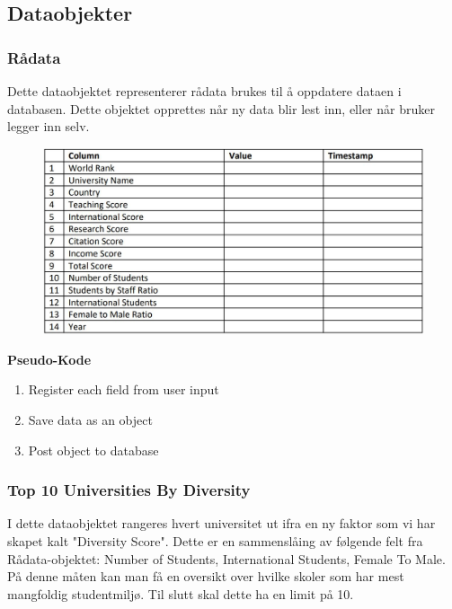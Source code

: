 \subsection{Dataobjekter}
\subsubsection{Rådata}
Dette dataobjektet representerer rådata brukes til å oppdatere dataen i databasen. Dette objektet 
opprettes når ny data blir lest inn, eller når bruker legger inn selv.

\FigureCounter
\begin{figure}[H]
  \includegraphics[scale=1]{images/milepael4/rawObject.JPG}
\end{figure}

\textbf{Pseudo-Kode}
\begin{enumerate}
  \item Register each field from user input
  \item Save data as an object
  \item Post object to database
\end{enumerate}

\subsubsection{Top 10 Universities By Diversity}
I dette dataobjektet rangeres hvert universitet ut ifra en ny faktor som vi har skapet kalt "Diversity 
Score". Dette er en sammenslåing av følgende felt fra Rådata-objektet: Number of Students, 
International Students, Female To Male. På denne måten kan man få en oversikt over hvilke skoler 
som har mest mangfoldig studentmiljø. Til slutt skal dette ha en limit på 10.

